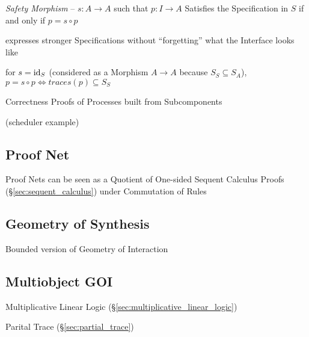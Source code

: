 \emph{Safety Morphism} -- $s: A \rightarrow A$ such that $p : I
\rightarrow A$ Satisfies the Specification in $S$ if and only if $p =
s \circ p$

expresses stronger Specifications without ``forgetting'' what the
Interface looks like

for $s = \mathrm{id}_S$ (considered as a Morphism $A \rightarrow A$ because
$S_S \subseteq S_A$), $p = s \circ p \Leftrightarrow traces(p)
\subseteq S_S$

Correctness Proofs of Processes built from Subcomponents

(scheduler example)



\subsection{Proof Net} \label{sec:proof_net}

\cite{llwiki16}

Proof Nets can be seen as a Quotient of One-sided Sequent Calculus
Proofs (\S\ref{sec:sequent_calculus}) under Commutation of Rules



\subsection{Geometry of Synthesis} \label{sec:geometry_of_synthesis}

Bounded version of Geometry of Interaction



\subsection{Multiobject GOI}\label{sec:multiobject_goi}

\cite{haghverdi-scott05}

Multiplicative Linear Logic (\S\ref{sec:multiplicative_linear_logic})

Parital Trace (\S\ref{sec:partial_trace})



